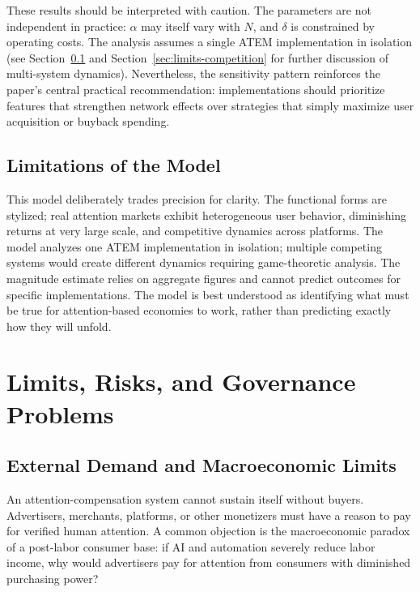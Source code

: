 \documentclass[12pt, a4paper]{article}
\begin{document}
These results should be interpreted with caution. The parameters are not independent in practice: $\alpha$ may itself vary with $N$, and $\delta$ is constrained by operating costs. The analysis assumes a single ATEM implementation in isolation (see Section~\ref{sec:model-limits} and Section~\ref{sec:limits-competition} for further discussion of multi-system dynamics). Nevertheless, the sensitivity pattern reinforces the paper's central practical recommendation: implementations should prioritize features that strengthen network effects over strategies that simply maximize user acquisition or buyback spending.

\subsection{Limitations of the Model}
\label{sec:model-limits}

This model deliberately trades precision for clarity. The functional forms are stylized; real attention markets exhibit heterogeneous user behavior, diminishing returns at very large scale, and competitive dynamics across platforms. The model analyzes one ATEM implementation in isolation; multiple competing systems would create different dynamics requiring game-theoretic analysis. The magnitude estimate relies on aggregate figures and cannot predict outcomes for specific implementations. The model is best understood as identifying what must be true for attention-based economies to work, rather than predicting exactly how they will unfold.


\section{Limits, Risks, and Governance Problems}
\label{sec:limits}

\subsection{External Demand and Macroeconomic Limits}
\label{sec:limits-demand}

An attention-compensation system cannot sustain itself without buyers. Advertisers, merchants, platforms, or other monetizers must have a reason to pay for verified human attention. A common objection is the macroeconomic paradox of a post-labor consumer base: if AI and automation severely reduce labor income, why would advertisers pay for attention from consumers with diminished purchasing power?
\end{document}
